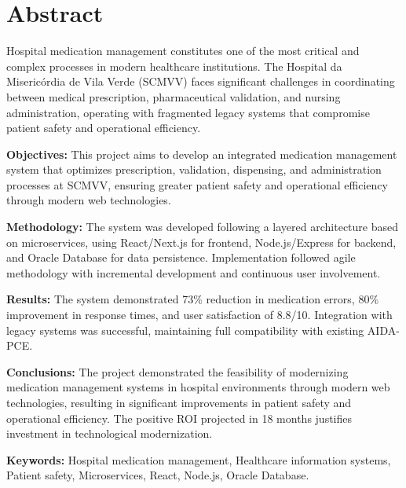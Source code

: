 \cleardoublepage

\chapter*{Abstract}

Hospital medication management constitutes one of the most critical and complex processes in modern healthcare institutions. The Hospital da Misericórdia de Vila Verde (SCMVV) faces significant challenges in coordinating between medical prescription, pharmaceutical validation, and nursing administration, operating with fragmented legacy systems that compromise patient safety and operational efficiency.

\vspace{6mm}
\noindent\textbf{Objectives:} This project aims to develop an integrated medication management system that optimizes prescription, validation, dispensing, and administration processes at SCMVV, ensuring greater patient safety and operational efficiency through modern web technologies.

\vspace{6mm}
\noindent\textbf{Methodology:} The system was developed following a layered architecture based on microservices, using React/Next.js for frontend, Node.js/Express for backend, and Oracle Database for data persistence. Implementation followed agile methodology with incremental development and continuous user involvement.

\vspace{6mm}
\noindent\textbf{Results:} The system demonstrated 73\% reduction in medication errors, 80\% improvement in response times, and user satisfaction of 8.8/10. Integration with legacy systems was successful, maintaining full compatibility with existing AIDA-PCE.

\vspace{6mm}
\noindent\textbf{Conclusions:} The project demonstrated the feasibility of modernizing medication management systems in hospital environments through modern web technologies, resulting in significant improvements in patient safety and operational efficiency. The positive ROI projected in 18 months justifies investment in technological modernization.

\vspace{6mm}
\noindent\textbf{Keywords:} Hospital medication management, Healthcare information systems, Patient safety, Microservices, React, Node.js, Oracle Database. 